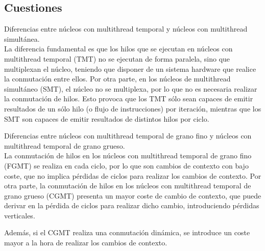 \subsection{Cuestiones}

\begin{cuestion}
    Diferencias entre núcleos con multithread temporal y núcleos con multithread simultánea.\\

    La diferencia fundamental es que los hilos que se ejecutan en núcleos con multithread temporal (TMT) no se ejecutan de forma paralela, sino que multiplexan el núcleo, teniendo que disponer de un sistema hardware que realice la conmutación entre ellos. Por otra parte, en los núcleos de multithread simultáneo (SMT), el núcleo no se multiplexa, por lo que no es necesaria realizar la conmutación de hilos. Esto provoca que los TMT sólo sean capaces de emitir resultados de un sólo hilo (o flujo de instrucciones) por iteración, mientras que los SMT son capaces de emitir resultados de distintos hilos por ciclo.
\end{cuestion}

\begin{cuestion}
    Diferencias entre núcleos con multithread temporal de grano fino y núcleos con multithread temporal de grano grueso.\\

    La conmutación de hilos en los núcleos con multithread temporal de grano fino (FGMT) se realiza en cada ciclo, por lo que son cambios de contexto con bajo coste, que no implica pérdidas de ciclos para realizar los cambios de contexto. Por otra parte, la conmutación de hilos en los núcleos con multithread temporal de grano grueso (CGMT) presenta un mayor coste de cambio de contexto, que puede derivar en la pérdida de ciclos para realizar dicho cambio, introduciendo pérdidas verticales.
    
    Además, si el CGMT realiza una conmutación dinámica, se introduce un coste mayor a la hora de realizar los cambios de contexto.
\end{cuestion}

